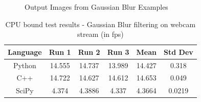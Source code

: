 \documentclass[english]{IEEEtran}
\providecommand{\tabularnewline}{\\}
\theoremstyle{plain}
\begin{document}
\begin{figure}[h]
\begin{centering}
{}
\par\end{centering}


\caption{\label{fig:Gaussian-Output-Images}Output Images from Gaussian Blur
Examples}

\end{figure}
%
\begin{table}
\caption{\label{tab:Gaussian-Results}CPU bound test results - Gaussian Blur
filtering on webcam stream (in fps)}


\centering{}\begin{tabular}{|c|c|c|c|c|c|}
\hline 
Language & Run 1 & Run 2 & Run 3 & Mean & Std Dev\tabularnewline
\hline
\hline 
Python & 14.555 & 14.737 & 13.989 & 14.427 & 0.318\tabularnewline
\hline 
C++ & 14.722 & 14.627 & 14.612 & 14.653 & 0.049\tabularnewline
\hline 
SciPy & 4.374 & 4.3886 & 4.337 & 4.3664 & 0.0219\tabularnewline
\hline
\end{tabular}
\end{table}
%
\end{document}
